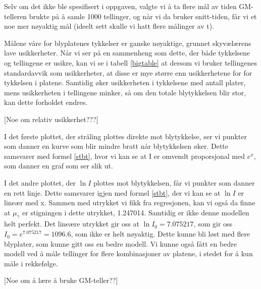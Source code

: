 Selv om det ikke ble spesifisert i oppgaven, valgte vi å ta flere mål av tiden GM-telleren brukte på å samle 1000 tellinger, og når vi da bruker snitt-tiden, får vi et noe mer nøyaktig mål (ideelt sett skulle vi hatt flere målinger av t).\medskip

Målene våre for blyplatenes tykkelser er ganske nøyaktige, grunnet skyvælærens lave usikkerheter. Når vi ser på en sammenheng som dette, der både tykkelsene og tellingene er usikre, kan vi se i tabell \ref{bigtable} at dersom vi bruker tellingenes standardavvik som usikkerheter, at disse er mye større enn usikkerhetene for for tykkelsen i platene. Samtidig øker usikkerheten i tykkelsene med antall plater, mens usikkerheten i tellingene minker, så om den totale blytykkelsen blir stor, kan dette forholdet endres.\medskip

[Noe om relativ usikkerhet???]\medskip

I det første plottet, der stråling plottes direkte mot blytykkelse, ser vi punkter som danner en kurve som blir mindre bratt når blytykkelsen øker. Dette samsvarer med formel \ref{stbt}, hvor vi kan se at I er omvendt proporsjonal med $e^x$, som danner en graf som ser slik ut.

I det andre plottet, der $\ln{I}$ plottes mot blytykkelsen, får vi punkter som danner en rett linje. Dette samsvarer igjen med formel \ref{stbt}, der vi kan se at $\ln{I}$ er lineær med x. Sammen med utrykket vi fikk fra regresjonen, kan vi også da finne at $\mu_\gamma$ er stigningen i dette utrykket, 1.247014. Samtidig er ikke denne modellen helt perfekt. Det lineære utrykket gir oss at $\ln{I_0} = 7.075217$, som gir oss $I_0 = e^{7.075217} = 1096.6$, som ikke er helt nøyaktig. Dette kunne bli løst med flere blyplater, som kunne gitt oss en bedre modell. Vi kunne også fått en bedre modell ved å måle tellinger for flere kombinasjoner av platene, i stedet for å kun måle i rekkefølge.\medskip

[Noe om å lære å bruke GM-teller??]
